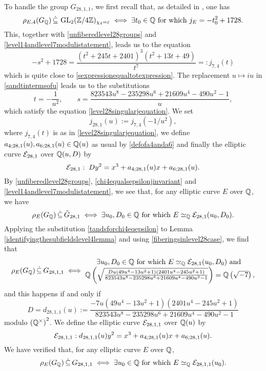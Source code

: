 To handle the group $G_{28,1,1}$, we first recall that, as detailed in \cite{sutherlandzywina}, one has
\begin{equation} \label{chi4equalsepsilonjinvariant}
\rho_{E,4}(G_{\mathbb{Q}}) \, \dot\subseteq \, \operatorname{GL}_2(\mathbb{Z}/4\mathbb{Z})_{\chi_4 = \varepsilon} \; \Longleftrightarrow \; \exists t_0 \in \mathbb{Q} \text{ for which } j_E = -t_0^2 + 1728.
\end{equation}
This, together with \eqref{unfiberedlevel28groups} and \eqref{level14andlevel7modulistatement}, leads us to the equation
\begin{equation} \label{level28singularjequation}
-s^2 + 1728 = \frac{(t^2 + 245t + 2401)^3(t^2 + 13t + 49)}{t^7} =: j_{7,4}(t)
\end{equation}
which is quite close to \eqref{sexpressionequaltotexpression}. The replacement $u \mapsto iu$ in \eqref{sandtintermsofu} leads us to the substitutions
\begin{equation} \label{tandsforchi4eqepsilon}
t = - \frac{1}{u^2}, \quad\quad s = \frac{823543u^8 - 235298u^6 + 21609u^4 - 490u^2 - 1}{u},
\end{equation}
which satisfy the equation \eqref{level28singularjequation}. We set 
\[
j_{28,1}(u) := j_{7,4}(-1/u^2),
\]
where $j_{7,4}(t)$ is as in \eqref{level28singularjequation}, we define $a_{4;28,1}(u), a_{6;28,1}(u) \in \mathbb{Q}(u)$ as usual by \eqref{defofa4anda6} and finally the elliptic curve $\mathcal{E}_{28,1}$ over $\mathbb{Q}(u,D)$ by
\[
\mathcal{E}_{28,1} : \; Dy^2 = x^3 + a_{4;28,1}(u) x + a_{6;28,1}(u).
\]
By \eqref{unfiberedlevel28groups}, \eqref{chi4equalsepsilonjinvariant} and \eqref{level14andlevel7modulistatement}, we see that, for any elliptic curve $E$ over $\mathbb{Q}$, we have
\[
\rho_{E}(G_{\mathbb{Q}}) \, \dot\subseteq \, \tilde{G}_{28,1} \; \Longleftrightarrow \; \exists u_0, D_0 \in \mathbb{Q} \text{ for which } E \simeq_{\mathbb{Q}} \mathcal{E}_{28,1}(u_0,D_0).
\]
Applying the substitution \eqref{tandsforchi4eqepsilon} to Lemma \ref{identifyingthesubfieldslevel4lemma} and using \eqref{fiberingsinlevel28case}, we find that
\[
\rho_{E}(G_{\mathbb{Q}}) \, \dot\subseteq \, G_{28,1,1} \; \Longleftrightarrow \; 
\begin{matrix} 
\exists u_0, D_0 \in \mathbb{Q} \text{ for which } E \simeq_{\mathbb{Q}} \mathcal{E}_{28,1}(u_0,D_0) \text{ and } \\
\mathbb{Q}\left( \sqrt{\frac{Du(49u^4 - 13u^2 + 1)(2401u^4 - 245u^2 + 1)}{823543u^8 - 235298u^6 + 21609u^4 - 490u^2 - 1}} \right) = \mathbb{Q}\left( \sqrt{-7} \right),
\end{matrix}
\]
and this happens if and only if
\[
D = d_{28,1,1}(u) := \frac{-7u(49u^4 - 13u^2 + 1)(2401u^4 - 245u^2 + 1)}{823543u^8 - 235298u^6 + 21609u^4 - 490u^2 - 1}
\]
modulo $\left( \mathbb{Q}^\times \right)^2$. We define the elliptic curve $\mathcal{E}_{28,1,1}$ over $\mathbb{Q}(u)$ by 
\[
\mathcal{E}_{28,1,1} : d_{28,1,1}(u) y^2 = x^3 + a_{4;28,1}(u) x + a_{6;28,1}(u).
\]
We have verified that, for any elliptic curve $E$ over $\mathbb{Q}$,
\[
\rho_{E}(G_{\mathbb{Q}}) \, \dot\subseteq \, G_{28,1,1} \; \Longleftrightarrow \; \exists u_0 \in \mathbb{Q} \text{ for which } E \simeq_{\mathbb{Q}} \mathcal{E}_{28,1,1}(u_0).
\]
